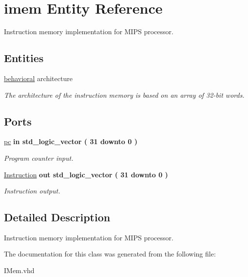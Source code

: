 \hypertarget{classimem}{\section{imem \-Entity \-Reference}
\label{classimem}
}


\-Instruction memory implementation for \-M\-I\-P\-S processor.  


\subsection*{\-Entities}
\begin{DoxyCompactItemize}
\item 
\hyperlink{classimem_1_1behavioral}{behavioral} architecture
\begin{DoxyCompactList}\small\item\em \-The architecture of the instruction memory is based on an array of 32-\/bit words. \end{DoxyCompactList}\end{DoxyCompactItemize}
\*
\*
\subsection*{\-Ports}
 \begin{DoxyCompactItemize}
\item 
\hypertarget{classimem_ad1a221c09af97e0f0a04247472ab8016}{\hyperlink{classimem_ad1a221c09af97e0f0a04247472ab8016}{pc}  {\bfseries {\bfseries in }} {\bfseries std\-\_\-logic\-\_\-vector (   31    downto    0  ) } }\label{classimem_ad1a221c09af97e0f0a04247472ab8016}

\begin{DoxyCompactList}\small\item\em \-Program counter input. \end{DoxyCompactList}\item 
\hypertarget{classimem_ac89b0bccd70cd43f4ea4ae5521cf8052}{\hyperlink{classimem_ac89b0bccd70cd43f4ea4ae5521cf8052}{\-Instruction}  {\bfseries {\bfseries out }} {\bfseries std\-\_\-logic\-\_\-vector (   31    downto    0  ) } }\label{classimem_ac89b0bccd70cd43f4ea4ae5521cf8052}

\begin{DoxyCompactList}\small\item\em \-Instruction output. \end{DoxyCompactList}\end{DoxyCompactItemize}


\subsection{\-Detailed \-Description}
\-Instruction memory implementation for \-M\-I\-P\-S processor. 

\-The documentation for this class was generated from the following file\-:\begin{DoxyCompactItemize}
\item 
\-I\-Mem.\-vhd\end{DoxyCompactItemize}
